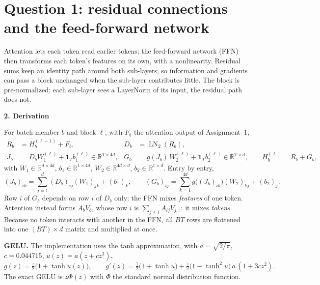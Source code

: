 \documentclass[11pt,a4paper]{article}
\numberwithin{equation}{section}
\newcommand{\R}{\mathbb{R}}
\newcommand{\one}{\mathbf 1}
\newcommand{\LN}{\operatorname{LN}}
\newcommand{\stephead}[1]{\par\smallskip\noindent\textbf{\small #1}\par\nobreak}
\begin{document}
\section{Question 1: residual connections and the feed-forward network}\label{sec:q1}

\begin{purpose}
Attention lets each token read earlier tokens; the feed-forward network (FFN) then transforms each token's features on
its own, with a nonlinearity. Residual sums keep an identity path around both sub-layers, so information and gradients
can pass a block unchanged when the sub-layer contributes little. The block is pre-normalized: each sub-layer sees a
LayerNorm of its input, the residual path does not.
\end{purpose}

\stephead{2. Derivation}
For batch member $b$ and block $\ell$, with $F_b$ the attention output of Assignment~1,
\begin{align}
R_b &= H_b^{(\ell-1)}+F_b, & D_b&=\LN_2(R_b), \\
J_b &= D_bW_1^{(\ell)}+\one_Tb_1^{(\ell)}\in\R^{T\times4d}, & G_b&=g(J_b)\,W_2^{(\ell)}+\one_Tb_2^{(\ell)}\in\R^{T\times d},\qquad
H_b^{(\ell)}=R_b+G_b,
\end{align}
with $W_1\in\R^{d\times4d}$, $b_1\in\R^{1\times4d}$, $W_2\in\R^{4d\times d}$, $b_2\in\R^{1\times d}$. Entry by entry,
\begin{equation}
(J_b)_{ik}=\sum_{j=1}^{d}(D_b)_{ij}(W_1)_{jk}+(b_1)_k,\qquad (G_b)_{ij}=\sum_{k=1}^{4d}g\big((J_b)_{ik}\big)(W_2)_{kj}+(b_2)_j .
\end{equation}
Row $i$ of $G_b$ depends on row $i$ of $D_b$ only: the FFN mixes \emph{features} of one token. Attention instead forms
$A_bV_b$, whose row $i$ is $\sum_{j\le i}A_{ij}V_{j,:}$: it mixes \emph{tokens}. Because no token interacts with another in the
FFN, all $BT$ rows are flattened into one $(BT)\times d$ matrix and multiplied at once.

\textbf{GELU.} The implementation uses the tanh approximation, with $a=\sqrt{2/\pi}$, $c=0.044715$, $u(z)=a(z+cz^3)$,
\begin{equation}
g(z)=\tfrac z2\big(1+\tanh u(z)\big),\qquad g'(z)=\tfrac12\big(1+\tanh u\big)+\tfrac z2\big(1-\tanh^2u\big)\,a\,(1+3cz^2).
\end{equation}
The exact GELU is $z\Phi(z)$ with $\Phi$ the standard normal distribution function.
\end{document}
